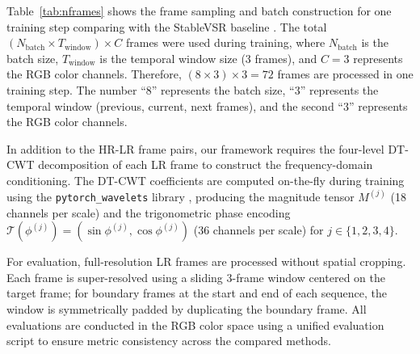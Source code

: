 Table~\ref{tab:nframes} shows the frame sampling and batch 
construction for one training step comparing with the StableVSR 
baseline \cite{rota2024stablevsr}. The total 
$(N_{\mathrm{batch}} \times T_{\mathrm{window}}) \times C$ 
frames were used during training, where $N_{\mathrm{batch}}$ is 
the batch size, $T_{\mathrm{window}}$ is the temporal window 
size (3 frames), and $C=3$ represents the RGB color channels. 
Therefore, $(8 \times 3) \times 3 = 72$ frames are processed in 
one training step. The number ``8'' represents the batch size, 
``3'' represents the temporal window (previous, current, next 
frames), and the second ``3'' represents the RGB color channels.

\begin{table}[htbp]
\caption{Frame sampling and batch construction for one training 
step.}
\label{tab:nframes}
\centering
{}
\end{table}

In addition to the HR-LR frame pairs, our framework requires 
the four-level DT-CWT decomposition of each LR frame to 
construct the frequency-domain conditioning. The DT-CWT 
coefficients are computed on-the-fly during training using the 
\texttt{pytorch\_wavelets} library \cite{cotter2019pytorch}, 
producing the magnitude tensor $M^{(j)}$ (18 channels per 
scale) and the trigonometric phase encoding 
$\mathcal{T}(\phi^{(j)}) = (\sin\phi^{(j)}, \cos\phi^{(j)})$ 
(36 channels per scale) for $j \in \{1, 2, 3, 4\}$.

For evaluation, full-resolution LR frames are processed without 
spatial cropping. Each frame is super-resolved using a sliding 
3-frame window centered on the target frame; for boundary 
frames at the start and end of each sequence, the window is 
symmetrically padded by duplicating the boundary frame. All 
evaluations are conducted in the RGB color space using a unified 
evaluation script to ensure metric consistency across the 
compared methods.

